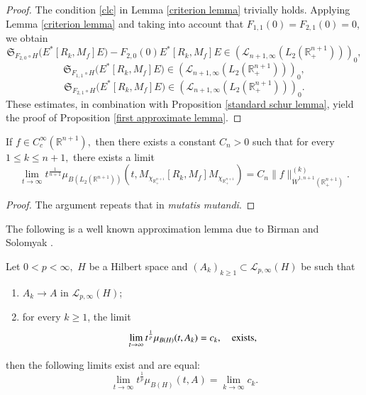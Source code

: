 \documentclass[12pt]{amsart}
\begin{document}
\begin{proof}
The condition \eqref{clc} in Lemma \ref{criterion lemma} trivially holds. Applying Lemma \ref{criterion lemma}
and taking into account that $F_{1,1}(0)=F_{2,1}(0)=0$, we obtain
$$\mathfrak{S}_{F_{2,0}\circ H}\Big(E^{\ast}[R_k,M_f]E\Big)-F_{2,0}(0) E^{\ast}[R_k,M_f]E\in (\mathcal{L}_{n+1,\infty}(L_2(\mathbb{R}^{n+1}_+)))_0,$$
$$\mathfrak{S}_{F_{1,1}\circ H}\Big(  E^{\ast}[R_k,M_f]E\Big)\in (\mathcal{L}_{n+1,\infty}(L_2(\mathbb{R}^{n+1}_+)))_0,$$
$$\mathfrak{S}_{F_{2,1}\circ H}\Big(  E^{\ast}[R_k,M_f]E\Big)\in (\mathcal{L}_{n+1,\infty}(L_2(\mathbb{R}^{n+1}_+)))_0.$$
These estimates, in combination with Proposition \ref{standard schur lemma}, yield the proof of Proposition \ref{first approximate lemma}.
\end{proof}

\begin{lemma}\label{from frank lemma} If $f\in C^{\infty}_c(\mathbb{R}^{n+1}),$ then there exists a constant $C_n>0$ such that for every $1\leq k\leq n+1,$ there exists a limit
$$\lim_{t\to\infty}t^{\frac1{n+1}}\mu_{B(L_2(\mathbb{R}^{n+1}))}(t, M_{\chi_{\mathbb{R}^{n+1}_+}}[R_k,M_f]M_{\chi_{\mathbb{R}^{n+1}_+}})=C_n\|f\|_{\dot{W}^{1,n+1}(\mathbb{R}_+^{n+1})}^{(k)}.$$
\end{lemma}
\begin{proof} The argument repeats that in \cite[Proposition 8.6]{FSZ} {\it mutatis mutandi}.
\end{proof}

The following is a well known approximation lemma due to Birman and Solomyak \cite[Section 11.6]{MR1192782}.

\begin{lemma}\label{approlem}
Let $0<p<\infty,$ $H$ be a Hilbert space and $(A_k)_{k\geq 1}\subset \mathcal{L}_{p,\infty}(H)$ be such that
\begin{enumerate}[{\rm (i)}]
\item $A_k\rightarrow A$ in $\mathcal{L}_{p,\infty}(H)$;
\item for every $k\geq 1$, the limit
$$\lim_{t\rightarrow \infty}t^{\frac{1}{p}}\mu_{B(H)}(t,A_k)=c_k,\quad {\rm exists},$$
\end{enumerate}
then the following limits exist and are equal:
$$\lim_{t\rightarrow \infty}t^{\frac{1}{p}}\mu_{B(H)}(t,A)=\lim_{k\rightarrow \infty}c_k.$$
\end{lemma}
\end{document}
